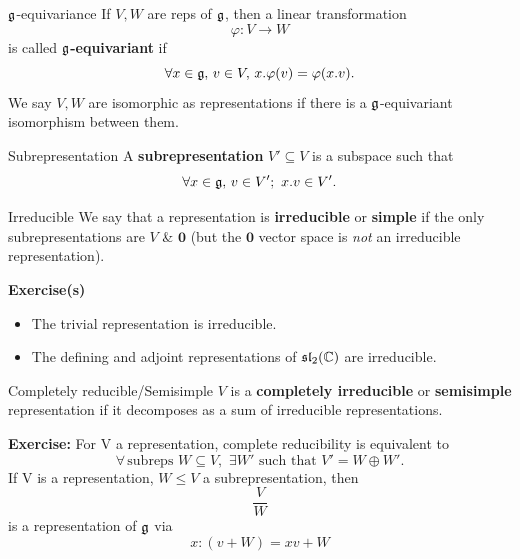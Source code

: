 \documentclass{article}
\begin{document}
\begin{fancydefine}{$\mathfrak{g}$-equivariance} 
    If $V,W$ are reps of $\mathfrak{g}$, then a linear transformation \[ \varphi : V \to W \]
    is called $\mathfrak{g}$\textbf{-equivariant} if \[ \forall x \in \mathfrak{g}, \, v \in V, \, x.\varphi(v) = \varphi(x.v). \]
    We say $V,W$ are isomorphic as representations if there is a $\mathfrak{g}$-equivariant isomorphism between them.
\end{fancydefine}
\begin{fancydefine}{Subrepresentation}
     A \textbf{subrepresentation} $V' \subseteq V$ is a subspace such that \[ \forall x \in \mathfrak{g}, \, v \in V'; \, \,x.v \in V'.\]
\end{fancydefine}
\begin{fancydefine}{Irreducible} 
    We say that a representation is \textbf{irreducible} or \textbf{simple} if the only subrepresentations are $V$ \& $\mathbf{0}$ (but the $\mathbf{0}$ vector space is \textit{not} an irreducible representation).
\end{fancydefine}
\textbf{Exercise(s)} \begin{itemize}
    \item The trivial representation is irreducible.
    \item The defining and adjoint representations of $\mathfrak{sl}_{2}(\mathbb{C})$ are irreducible.
\end{itemize}







\newlec 












\begin{fancydefine}{Completely reducible/Semisimple} 
    $V$ is a \textbf{completely irreducible} or \textbf{semisimple} representation if it decomposes as a sum of irreducible representations.
\end{fancydefine} 
\textbf{Exercise: }For V a representation, complete reducibility is equivalent to \[ \forall\, \text{subreps }W \subseteq  V, \, \, \exists W' \text{ such that } V' = W \oplus W'. \]
 If V is a representation, $W \leq V$ a subrepresentation, then \[ \frac{V}{W} \] is a representation of $\mathfrak{g}$ via \[ x : (v + W) = xv + W \]
\end{document}
